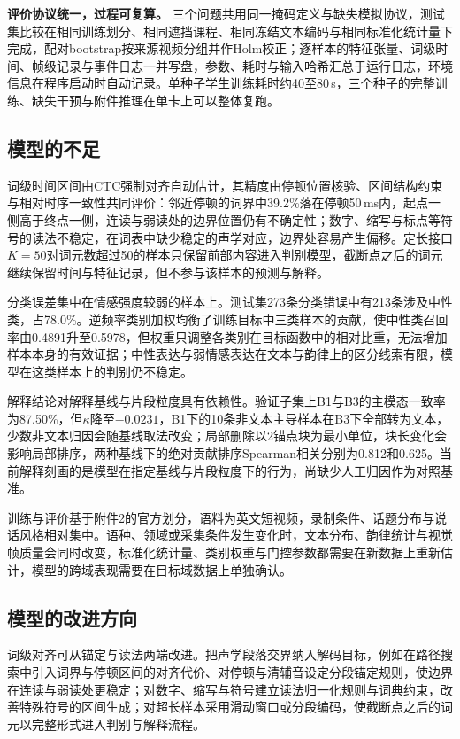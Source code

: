 \textbf{评价协议统一，过程可复算。} 三个问题共用同一掩码定义与缺失模拟协议，测试集比较在相同训练划分、相同遮挡课程、相同冻结文本编码与相同标准化统计量下完成，配对bootstrap按来源视频分组并作Holm校正；逐样本的特征张量、词级时间、帧级记录与事件日志一并写盘，参数、耗时与输入哈希汇总于运行日志，环境信息在程序启动时自动记录。单种子学生训练耗时约40至80\,s，三个种子的完整训练、缺失干预与附件推理在单卡上可以整体复跑。

\subsection{模型的不足}

词级时间区间由CTC强制对齐自动估计，其精度由停顿位置核验、区间结构约束与相对时序一致性共同评价：邻近停顿的词界中39.2\%落在停顿50\,ms内，起点一侧高于终点一侧，连读与弱读处的边界位置仍有不确定性；数字、缩写与标点等符号的读法不稳定，在词表中缺少稳定的声学对应，边界处容易产生偏移。定长接口$K=50$对词元数超过50的样本只保留前部内容进入判别模型，截断点之后的词元继续保留时间与特征记录，但不参与该样本的预测与解释。

分类误差集中在情感强度较弱的样本上。测试集273条分类错误中有213条涉及中性类，占78.0\%。逆频率类别加权均衡了训练目标中三类样本的贡献，使中性类召回率由0.4891升至0.5978，但权重只调整各类别在目标函数中的相对比重，无法增加样本本身的有效证据；中性表达与弱情感表达在文本与韵律上的区分线索有限，模型在这类样本上的判别仍不稳定。

解释结论对解释基线与片段粒度具有依赖性。验证子集上B1与B3的主模态一致率为87.50\%，但$\kappa$降至$-0.0231$，B1下的10条非文本主导样本在B3下全部转为文本，少数非文本归因会随基线取法改变；局部删除以2锚点块为最小单位，块长变化会影响局部排序，两种基线下的绝对贡献排序Spearman相关分别为0.812和0.625。当前解释刻画的是模型在指定基线与片段粒度下的行为，尚缺少人工归因作为对照基准。

训练与评价基于附件2的官方划分，语料为英文短视频，录制条件、话题分布与说话风格相对集中。语种、领域或采集条件发生变化时，文本分布、韵律统计与视觉帧质量会同时改变，标准化统计量、类别权重与门控参数都需要在新数据上重新估计，模型的跨域表现需要在目标域数据上单独确认。

\subsection{模型的改进方向}

词级对齐可从锚定与读法两端改进。把声学段落交界纳入解码目标，例如在路径搜索中引入词界与停顿区间的对齐代价、对停顿与清辅音设定分段锚定规则，使边界在连读与弱读处更稳定；对数字、缩写与符号建立读法归一化规则与词典约束，改善特殊符号的区间生成；对超长样本采用滑动窗口或分段编码，使截断点之后的词元以完整形式进入判别与解释流程。

